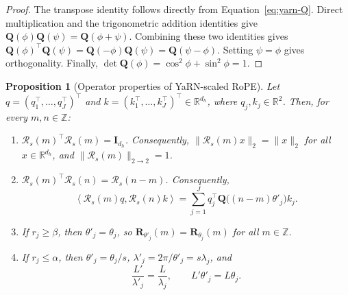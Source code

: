 \documentclass[11pt]{article}
\newtheorem{proposition}{Proposition}
\begin{document}
\begin{proof}
The transpose identity follows directly from Equation~\eqref{eq:yarn-Q}. Direct multiplication and the trigonometric addition identities give \(\mathbf Q(\phi)\mathbf Q(\psi)=\mathbf Q(\phi+\psi)\). Combining these two identities gives \(\mathbf Q(\phi)^\top\mathbf Q(\psi)=\mathbf Q(-\phi)\mathbf Q(\psi)=\mathbf Q(\psi-\phi)\). Setting \(\psi=\phi\) gives orthogonality. Finally, \(\det \mathbf Q(\phi)=\cos^2\phi+\sin^2\phi=1\).
\end{proof}

\begin{proposition}[Operator properties of YaRN-scaled RoPE]
\label{prop:yarn-operator}
Let \(q=(q_1^\top,\dots,q_J^\top)^\top\) and \(k=(k_1^\top,\dots,k_J^\top)^\top\in\mathbb R^{d_h}\), where \(q_j,k_j\in\mathbb R^2\). Then, for every \(m,n\in\mathbb Z\):
\begin{enumerate}
    \item \(\mathcal R_s(m)^\top \mathcal R_s(m)=\mathbf I_{d_h}\). Consequently, \(\|\mathcal R_s(m)x\|_2=\|x\|_2\) for all \(x\in\mathbb R^{d_h}\), and \(\|\mathcal R_s(m)\|_{2\to 2}=1\).
    \item \(\mathcal R_s(m)^\top \mathcal R_s(n)=\mathcal R_s(n-m)\). Consequently,
    \begin{equation}
    \left\langle \mathcal R_s(m)q,\mathcal R_s(n)k\right\rangle
    =
    \sum_{j=1}^{J} q_j^\top \mathbf Q\!\bigl((n-m)\theta'_j\bigr)k_j.
    \label{eq:yarn-blockwise-relative}
    \end{equation}
    \item If \(r_j\ge \beta\), then \(\theta'_j=\theta_j\), so \(\mathbf R_{\theta'_j}(m)=\mathbf R_{\theta_j}(m)\) for all \(m\in\mathbb Z\).
    \item If \(r_j\le \alpha\), then \(\theta'_j=\theta_j/s\), \(\lambda'_j=2\pi/\theta'_j=s\lambda_j\), and
    \begin{equation}
    \frac{L'}{\lambda'_j}=\frac{L}{\lambda_j},
    \qquad
    L'\theta'_j=L\theta_j.
    \label{eq:yarn-phase-preservation}
    \end{equation}
\end{enumerate}
\end{proposition}
\end{document}
